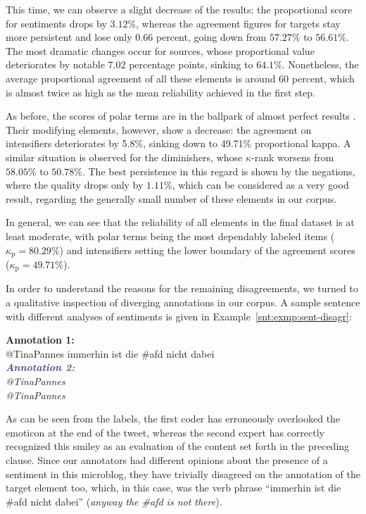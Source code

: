 This time, we can observe a slight decrease of the results: the
proportional score for sentiments drops by $3.12\%$, whereas the
agreement figures for targets stay more persistent and lose only 0.66
percent, going down from $57.27\%$ to $56.61\%$.  The most dramatic
changes occur for sources, whose proportional value deteriorates by
notable $7.02$ percentage points, sinking to $64.1\%$.  Nonetheless,
the average proportional agreement of all these elements is around 60
percent, which is almost twice as high as the mean reliability
achieved in the first step.

As before, the scores of polar terms are in the ballpark of
almost perfect results \cite[cf.][]{Landis:77}.  Their modifying
elements, however, show a decrease: the agreement on intensifiers
deteriorates by 5.8\%, sinking down to 49.71\% proportional kappa.  A
similar situation is observed for the diminishers, whose $\kappa$-rank
worsens from $58.05\%$ to $50.78\%$.  The best persistence in this
regard is shown by the negations, where the quality drops only by
$1.11\%$, which can be considered as a very good result, regarding the
generally small number of these elements in our corpus.

In general, we can see that the reliability of all elements in the
final dataset is at least moderate, with polar terms being
the most dependably labeled items ($\kappa_{\textrm{p}}=80.29\%$) and
intensifiers setting the lower boundary of the agreement scores
($\kappa_{\textrm{p}}=49.71\%$).

In order to understand the reasons for the remaining disagreements, we
turned to a qualitative inspection of diverging annotations in our
corpus.  A sample sentence with different analyses of sentiments is
given in Example~\ref{snt:exmp:sent-disagr}:
\begin{example}\label{snt:exmp:sent-disagr}
  \textcolor{red3}{\textbf{Annotation 1:}}\\ \upshape{}@TinaPannes
  immerhin ist die \#afd nicht dabei \smiley{}\\[0.8em]\itshape
  \noindent\textcolor{darkslateblue}{\textbf{\itshape Annotation
      2:}}\\ \upshape{}@TinaPannes
  \\[0.8em]
  \noindent\itshape{}@TinaPannes
  \upshape{}
\end{example}
As can be seen from the labels, the first coder has erroneously
overlooked the emoticon \smiley{} at the end of the tweet, whereas the
second expert has correctly recognized this smiley as an evaluation of
the content set forth in the preceding clause.  Since our annotators
had different opinions about the presence of a sentiment in this
microblog, they have trivially disagreed on the annotation of the
target element too, which, in this case, was the verb phrase
``immerhin ist die \#afd nicht dabei'' (\emph{anyway the \#afd is not
  there}).

